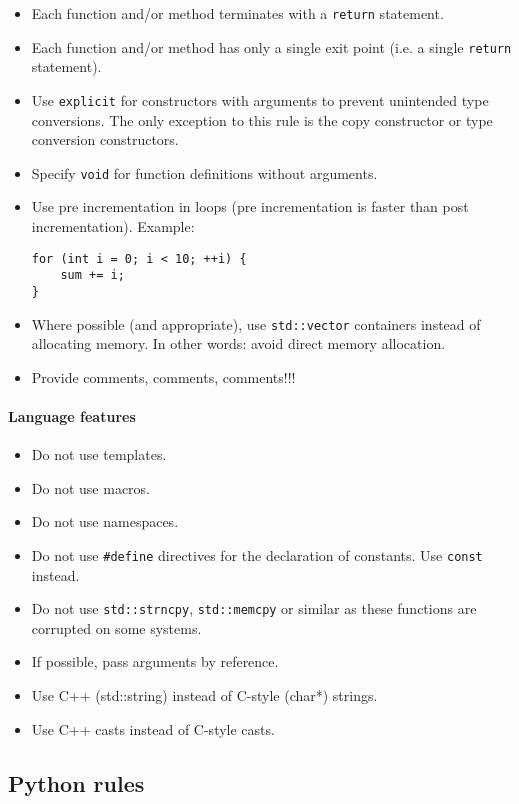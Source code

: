 \documentclass{article}[12pt,a4]
\begin{document}
\begin{itemize}
\item Each function and/or method terminates with a {\tt return} statement.
\item Each function and/or method has only a single exit point (i.e. a single {\tt return} statement).
\item Use {\tt explicit} for constructors with arguments to prevent unintended type conversions.
The only exception to this rule is the copy constructor or type conversion constructors.
\item Specify {\tt void} for function definitions without arguments.
\item Use pre incrementation in loops (pre incrementation is faster than post incrementation).
Example:
\begin{verbatim}
for (int i = 0; i < 10; ++i) {
    sum += i;
}
\end{verbatim}
\item Where possible (and appropriate), use {\tt std::vector} containers instead of
allocating memory. In other words: avoid direct memory allocation.
\item Provide comments, comments, comments!!!
\end{itemize}


\paragraph{Language features}

\begin{itemize}
\item Do not use templates.
\item Do not use macros.
\item Do not use namespaces.
\item Do not use {\tt \#define} directives for the declaration of constants. Use {\tt const} instead.
\item Do not use {\tt std::strncpy}, {\tt std::memcpy} or similar as these functions are corrupted on
some systems.
\item If possible, pass arguments by reference.
\item Use C++ (std::string) instead of C-style (char*) strings.
\item Use C++ casts instead of C-style casts.
\end{itemize}

\subsection{Python rules}
\end{document}
